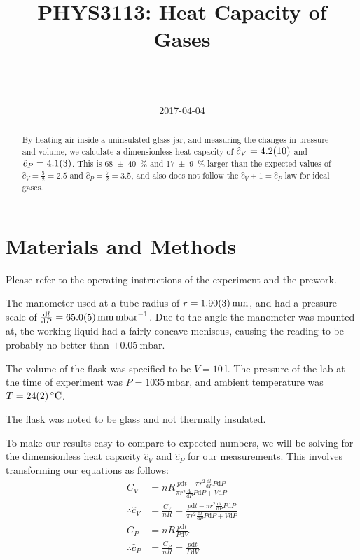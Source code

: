 \documentclass[a4paper]{scrartcl}
\begin{document}
\title{PHYS3113: Heat Capacity of Gases}
\author{ \\ \\ }
\date{2017-04-04}
\maketitle

\begin{abstract}
    By heating air inside a uninsulated glass jar, and measuring the changes in pressure and volume, we calculate a dimensionless heat capacity of \(\hat{c}_V = \SI{4.2 \pm 1.0}{}\) and \(\hat{c}_P = \SI{4.1 \pm 0.3}{}\). This is \SI{68 \pm 40}{\percent} and \SI{17 \pm 9}{\percent} larger than the expected values of \(\hat{c}_V = \frac{5}{2} = 2.5\) and \(\hat{c}_P = \frac{7}{2} = 3.5\), and also does not follow the \(\hat{c}_V + 1 = \hat{c}_P\) law for ideal gases.
\end{abstract}

\section{Materials and Methods}
Please refer to the operating instructions of the experiment and the prework.

The manometer used at a tube radius of \(r = \SI{1.90 \pm 0.03}{\milli\metre}\), and had a pressure scale of \(\frac{\mathrm{d} l}{\mathrm{d} P} = \SI{65.0 \pm 0.5}{\milli\metre\per\milli\bar}\). Due to the angle the manometer was mounted at, the working liquid had a fairly concave meniscus, causing the reading to be probably no better than \(\pm \SI{0.05}{\milli\bar}\).

The volume of the flask was specified to be \(V = \SI{10}{\litre}\). The pressure of the lab at the time of experiment was \(P = \SI{1035}{\milli\bar}\), and ambient temperature was \(T = \SI{24 \pm 2}{\degreeCelsius}\).

The flask was noted to be glass and not thermally insulated.

To make our results easy to compare to expected numbers, we will be solving for the dimensionless heat capacity \(\hat{c}_V\) and \(\hat{c}_P\) for our measurements. This involves transforming our equations as follows:
\begin{align*}
    C_V &= n R\frac{p \mathrm{d} t - \pi r^2 \frac{\mathrm{d} l}{\mathrm{d} P} P \mathrm{d} P}{\pi r^2 \frac{\mathrm{d} l}{\mathrm{d} P} P \mathrm{d} P + V \mathrm{d} P} \\
    \therefore \hat{c}_V &= \frac{C_V}{n R} = \frac{p \mathrm{d} t - \pi r^2 \frac{\mathrm{d} l}{\mathrm{d} P} P \mathrm{d} P}{\pi r^2 \frac{\mathrm{d} l}{\mathrm{d} P} P \mathrm{d} P + V \mathrm{d} P} \\
    C_P &= n R \frac{p \mathrm{d} t}{P \mathrm{d} V} \\
    \therefore \hat{c}_P &= \frac{C_P}{n R} = \frac{p \mathrm{d} t}{P \mathrm{d} V}
\end{align*}
\end{document}
